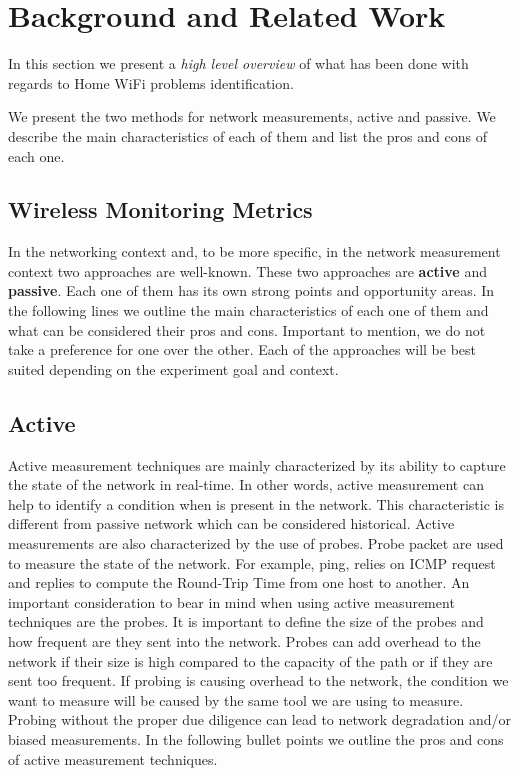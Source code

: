 \section{Background and Related Work}\label{Back_Related_Work}

In this section we present a \emph{high level overview} of what has been done with regards to Home WiFi problems identification.

We present the two methods for network measurements, active and passive. We describe the main characteristics of each of them and list the pros and cons of each one.

\subsection{Wireless Monitoring Metrics}\label{Wireless Monitoring Metrics}

In the networking context and, to be more specific, in the network measurement context two approaches are well-known. These two approaches are \textbf{active} and \textbf{passive}. Each one of them has its own strong points and opportunity areas. In the following lines we outline the main characteristics of each one of them and what can be considered their pros and cons. Important to mention, we do not take a preference for one over the other. Each of the approaches will be best suited depending on the experiment goal and context.

\subsection*{Active}

Active measurement techniques are mainly characterized by its ability to capture the state of the network in real-time. In other words, active measurement can help to identify a condition when is present in the network. This characteristic is different from passive network which can be considered historical. Active measurements are also characterized by the use of probes. Probe packet are used to measure the state of the network. For example, ping, relies on ICMP request and replies to compute the Round-Trip Time from one host to another. An important consideration to bear  in mind when using active measurement techniques are the probes. It is important to define the size of the probes and how frequent are they sent into the network. Probes can add overhead to the network if their size is high compared to the capacity of the path or if they are sent too frequent. If probing is causing overhead to the network, the condition we want to measure will be caused by the same tool we are using to measure. Probing without the proper due diligence can lead to network degradation and/or biased measurements. In the following bullet points we outline the pros and cons of active measurement techniques.

